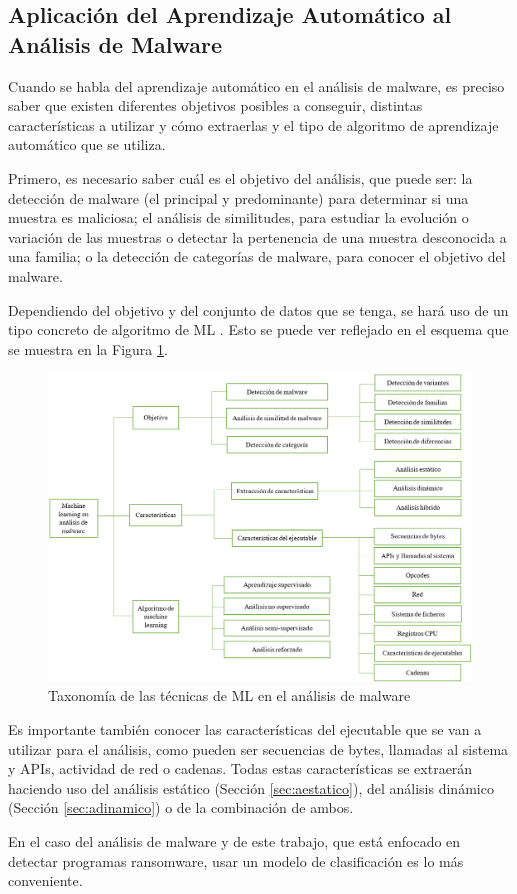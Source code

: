 \subsection{Aplicación del Aprendizaje Automático al Análisis de Malware}

\noindent Cuando se habla del aprendizaje automático en el análisis de malware, es preciso saber que existen diferentes objetivos posibles a conseguir, distintas características a utilizar y cómo extraerlas y el tipo de algoritmo de aprendizaje automático que se utiliza.

Primero, es necesario saber cuál es el objetivo del análisis, que puede ser: la detección de malware (el principal y predominante) para determinar si una muestra es maliciosa; el análisis de similitudes, para estudiar la evolución o variación de las muestras o detectar la pertenencia de una muestra desconocida a una familia; o la detección de categorías de malware, para conocer el objetivo del malware.

Dependiendo del objetivo y del conjunto de datos que se tenga, se hará uso de un tipo concreto de algoritmo de \gls{ML} \cite{Ucci2019}. Esto se puede ver reflejado en el esquema que se muestra en la Figura \ref{fig:esquemaml}.

\begin{figure}[htb!]
\begin{center}
\includegraphics[width=1\linewidth]{images/esquemaml.PNG}
\end{center}
\caption{Taxonomía de las técnicas de ML en el análisis de malware \cite{Ucci2019}}
\label{fig:esquemaml}
\end{figure}

Es importante también conocer las características del ejecutable que se van a utilizar para el análisis, como pueden ser secuencias de bytes, llamadas al sistema y \gls{API}s, actividad de red o cadenas. Todas estas características se extraerán haciendo uso del análisis estático (Sección \ref{sec:aestatico}), del análisis dinámico (Sección \ref{sec:adinamico}) o de la combinación de ambos.

En el caso del análisis de malware y de este trabajo, que está enfocado en detectar programas ransomware, usar un modelo de clasificación es lo más conveniente.
